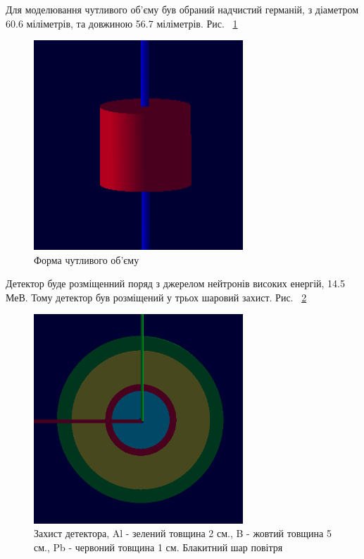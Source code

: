 \documentclass[a4paper, 14pt]{article}
\numberwithin{equation}{section}
\numberwithin{table}{section}
\begin{document}
	Для моделювання чутливого об'єму був обраний надчистий германій, з діаметром 60.6 міліметрів, та довжиною 56.7 міліметрів. Рис. ~\ref{ris:s_detector_volume} 	
	\begin{figure}[hbt!]
		\centering \includegraphics[width=0.7\textwidth]{images/sDetector158cm3.png}
		\caption{Форма чутливого об'єму} 
		\label{ris:s_detector_volume}	
	\end{figure}

	Детектор буде розміщенний поряд з джерелом нейтронів високих енергій, 14.5 МеВ. Тому детектор був розміщений у трьох шаровий захист. Рис. ~\ref{ris:s_detector_P}	
	\begin{figure}[hbt!]
		\centering \includegraphics[width=0.7\textwidth]{images/dectorPrt.png}
		\caption{Захист детектора, Al - зелений товщина 2 см., B - жовтий товщина 5 см., Pb - червоний товщина 1 см. Блакитний шар повітря} 
		\label{ris:s_detector_P}	
	\end{figure} 
\end{document}
